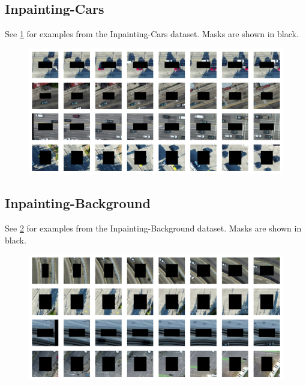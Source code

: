 \subsection{Inpainting-Cars}
See \cref{fig:cars-examples} for examples from the Inpainting-Cars dataset. Masks are shown in black.
\begin{figure}[h!]
\begin{center}
    \centering
    \captionsetup{type=figure}
    \includegraphics[width=\linewidth]{figures/dataset-examples/cars-examples.pdf}
    \label{fig:cars-examples}
\end{center}
\end{figure}
\subsection{Inpainting-Background}
See \cref{fig:bg-examples} for examples from the Inpainting-Background dataset. Masks are shown in black.
\begin{figure}[h!]
\begin{center}
    \centering
    \captionsetup{type=figure}
    \includegraphics[width=\linewidth]{figures/dataset-examples/bg-examples.pdf}
    \label{fig:bg-examples}
\end{center}
\end{figure}
